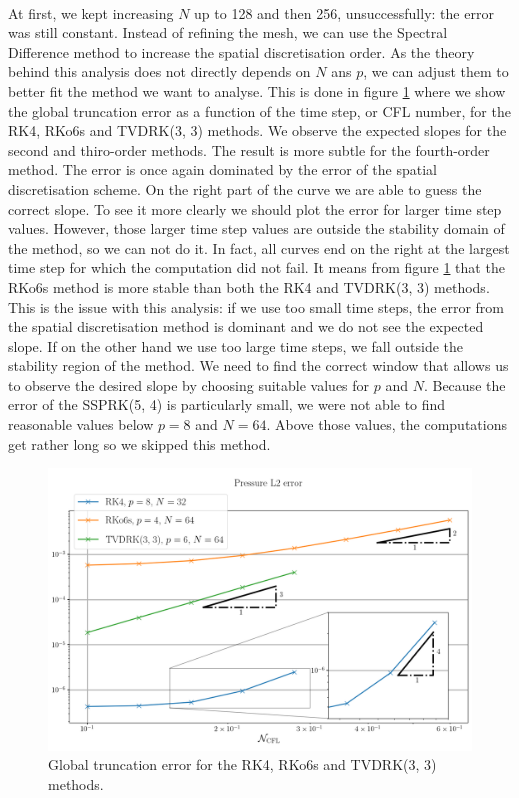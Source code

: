       \paragraph{}
      At first, we kept increasing $N$ up to 128 and then 256, unsuccessfully: the error was still constant.
      Instead of refining the mesh, we can use the Spectral Difference method to increase the spatial discretisation order.
      As the theory behind this analysis does not directly depends on $N$ ans $p$, we can adjust them to better fit the method we want to analyse.
      This is done in figure \ref{fig:covo_rk} where we show the global truncation error as a function of the time step, or CFL number, for the RK4, RKo6s and TVDRK(3, 3) methods.
      We observe the expected slopes for the second and thiro-order methods.
      The result is more subtle for the fourth-order method.
      The error is once again dominated by the error of the spatial discretisation scheme.
      On the right part of the curve we are able to guess the correct slope.
      To see it more clearly we should plot the error for larger time step values.
      However, those larger time step values are outside the stability domain of the method, so we can not do it.
      In fact, all curves end on the right at the largest time step for which the computation did not fail.
      It means from figure \ref{fig:covo_rk} that the RKo6s method is more stable than both the RK4 and TVDRK(3, 3) methods.
      This is the issue with this analysis: if we use too small time steps, the error from the spatial discretisation method is dominant and we do not see the expected slope.
      If on the other hand we use too large time steps, we fall outside the stability region of the method.
      We need to find the correct window that allows us to observe the desired slope by choosing suitable values for $p$ and $N$.
      Because the error of the SSPRK(5, 4) is particularly small, we were not able to find reasonable values below $p = 8$ and $N = 64$.
      Above those values, the computations get rather long so we skipped this method.

      \begin{figure}
        \centering
        \includegraphics[width=\textwidth]{figures/covo_rk.png}
        \caption{Global truncation error for the RK4, RKo6s and TVDRK(3, 3) methods.}
        \label{fig:covo_rk}
      \end{figure}

